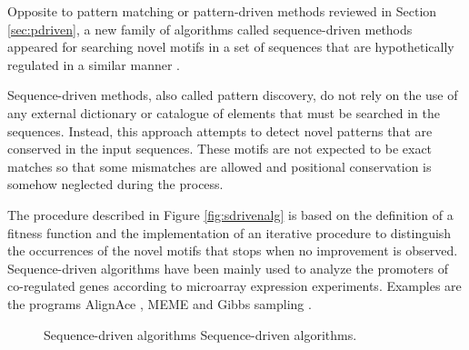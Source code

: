 
Opposite to pattern matching or pattern-driven methods reviewed in Section \ref{sec:pdriven}, a new family
of algorithms called sequence-driven methods appeared for searching novel motifs in a set of sequences 
that are hypothetically regulated in a similar manner \citep{brazma:1998a}.

Sequence-driven methods, also called pattern discovery,  
do not rely on the use of any external dictionary
or catalogue of elements that must be searched in the sequences. Instead, this approach attempts to
detect novel patterns that are conserved in the input sequences. These motifs are not expected to
be exact matches so that some mismatches are allowed and positional conservation is somehow neglected
during the process.

The procedure described in Figure \ref{fig:sdrivenalg} is based on the definition of a fitness function and
the implementation of an iterative procedure to distinguish the occurrences of the novel motifs that
stops when no improvement is observed. Sequence-driven algorithms have been mainly used to 
analyze the promoters of co-regulated genes according to microarray expression experiments. Examples are 
the programs AlignAce \citep{roth:1998a}, MEME \citep{bailey:1994a} and Gibbs sampling \citep{lawrence:1993a}.

\begin{figure}[t!]
\begin{center}
          {Sequence-driven algorithms}%
          {Sequence-driven algorithms.}%
          {}
\end{center}
\end{figure}



